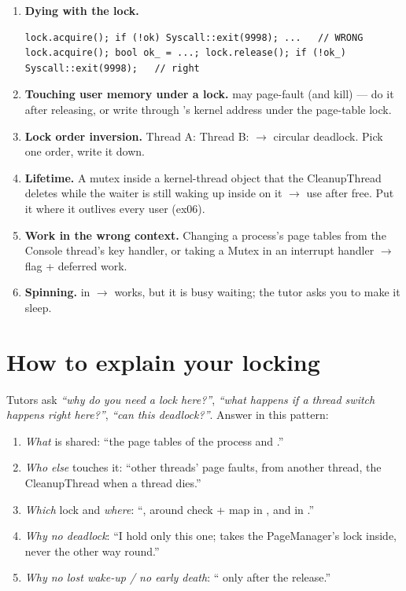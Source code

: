 \begin{enumerate}
\item \textbf{Dying with the lock.}
\begin{lstlisting}[style=cpp]
lock.acquire(); if (!ok) Syscall::exit(9998); ...   // WRONG
lock.acquire(); bool ok_ = ...; lock.release(); if (!ok_) Syscall::exit(9998);   // right
\end{lstlisting}

\item \textbf{Touching user memory under a lock.}  may
  page-fault (and kill) --- do it after releasing, or write through
  's kernel address under the page-table lock.

\item \textbf{Lock order inversion.} Thread A:  Thread B:
   $\to$ circular deadlock. Pick one order, write it down.

\item \textbf{Lifetime.} A mutex inside a kernel-thread object that the CleanupThread
  deletes while the waiter is still waking up inside  on it $\to$ use after
  free. Put it where it outlives every user (ex06).

\item \textbf{Work in the wrong context.} Changing a process's page tables from the Console
  thread's key handler, or taking a Mutex in an interrupt handler $\to$ flag + deferred work.

\item \textbf{Spinning.}  in  $\to$
  works, but it is busy waiting; the tutor asks you to make it sleep.
\end{enumerate}

\section{How to explain your locking}

Tutors ask \emph{``why do you need a lock here?''}, \emph{``what happens if a thread switch
happens right here?''}, \emph{``can this deadlock?''}. Answer in this pattern:

\begin{enumerate}
\item \emph{What} is shared: ``the page tables of the process and .''
\item \emph{Who else} touches it: ``other threads' page faults,  from another
  thread, the CleanupThread when a thread dies.''
\item \emph{Which} lock and \emph{where}: ``, around check + map in
  , and in .''
\item \emph{Why no deadlock}: ``I hold only this one;  takes the PageManager's
  lock inside, never the other way round.''
\item \emph{Why no lost wake-up / no early death}: `` only after the release.''
\end{enumerate}

